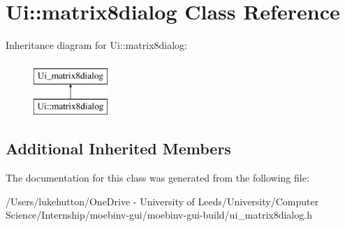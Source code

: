 \hypertarget{class_ui_1_1matrix8dialog}{}\section{Ui\+:\+:matrix8dialog Class Reference}
\label{class_ui_1_1matrix8dialog}
Inheritance diagram for Ui\+:\+:matrix8dialog\+:\begin{figure}[H]
\begin{center}
\leavevmode
\includegraphics[height=2.000000cm]{class_ui_1_1matrix8dialog}
\end{center}
\end{figure}
\subsection*{Additional Inherited Members}


The documentation for this class was generated from the following file\+:\begin{DoxyCompactItemize}
\item 
/\+Users/lukehutton/\+One\+Drive -\/ University of Leeds/\+University/\+Computer Science/\+Internship/moebinv-\/gui/moebinv-\/gui-\/build/ui\+\_\+matrix8dialog.\+h\end{DoxyCompactItemize}
